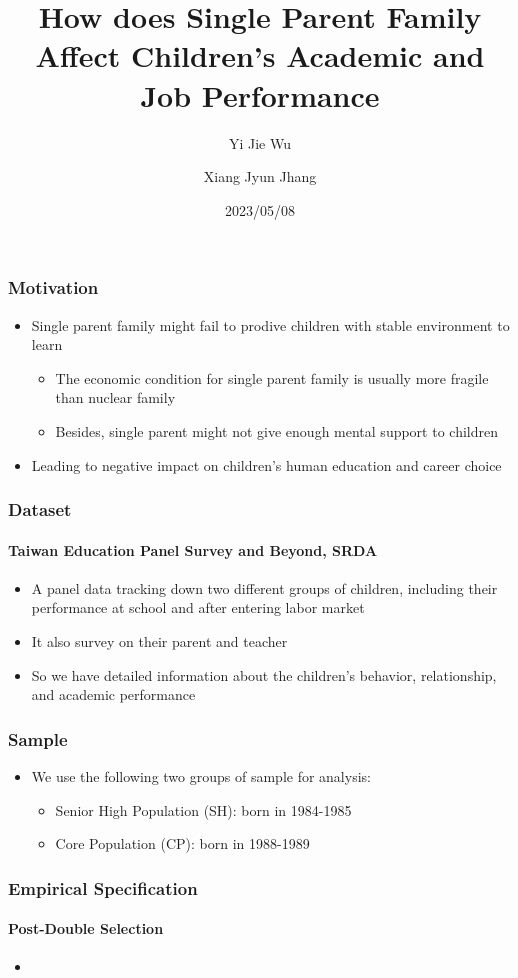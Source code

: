 \documentclass{beamer}
\title{How does Single Parent Family Affect Children's Academic and Job Performance}
\author[Yi Jie Wu, Xiang Jyun Jhang]{Yi Jie Wu\inst{1} \and Xiang Jyun Jhang\inst{2}}
\institute[NTU]
{
    \inst{1}
    Department of Economics \\
    National Taiwan University
    \and
    \inst{2}
    Department of Economics \\ 
    National Taiwan University
}
\date{2023/05/08}
\begin{document}
\frame{\titlepage}


\begin{frame} %
\frametitle{Motivation}
\begin{itemize}
    \item Single parent family might fail to prodive children with stable environment to learn
    \begin{itemize}
        \item The economic condition for single parent family is usually more fragile than nuclear family
        \item Besides, single parent might not give enough mental support to children
    \end{itemize}
    \item Leading to negative impact on children's human education and career choice
\end{itemize}
\end{frame}


\begin{frame} %
\frametitle{Dataset}
\framesubtitle{Taiwan Education Panel Survey and Beyond, SRDA}
\begin{itemize}
    \item A panel data tracking down two different groups of children, including their performance at school and after entering labor market
    \item It also survey on their parent and teacher
    \item So we have detailed information about the children's behavior, relationship, and academic performance
\end{itemize}
\end{frame}


\begin{frame} %
\frametitle{Sample}
\begin{itemize}
    \item We use the following two groups of sample for analysis:
    \begin{itemize}
        \item Senior High Population (SH): born in 1984-1985
        \item Core Population (CP): born in 1988-1989
    \end{itemize}
\end{itemize}
\end{frame}


\begin{frame} %
\frametitle{Empirical Specification}
\framesubtitle{Post-Double Selection}
\begin{itemize}
    \item  
\end{itemize}
\end{frame}
    
\end{document}
